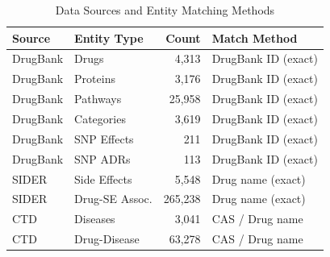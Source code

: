 \begin{table}[htbp]
\centering
\caption{Data Sources and Entity Matching Methods}
\label{tab:data_sources}
\begin{tabular}{llrl}
\toprule
\textbf{Source} & \textbf{Entity Type} & \textbf{Count} & \textbf{Match Method} \\
\midrule
DrugBank & Drugs & 4,313 & DrugBank ID (exact) \\
DrugBank & Proteins & 3,176 & DrugBank ID (exact) \\
DrugBank & Pathways & 25,958 & DrugBank ID (exact) \\
DrugBank & Categories & 3,619 & DrugBank ID (exact) \\
DrugBank & SNP Effects & 211 & DrugBank ID (exact) \\
DrugBank & SNP ADRs & 113 & DrugBank ID (exact) \\
\midrule
SIDER & Side Effects & 5,548 & Drug name (exact) \\
SIDER & Drug-SE Assoc. & 265,238 & Drug name (exact) \\
\midrule
CTD & Diseases & 3,041 & CAS / Drug name \\
CTD & Drug-Disease & 63,278 & CAS / Drug name \\
\bottomrule
\end{tabular}
\end{table}
